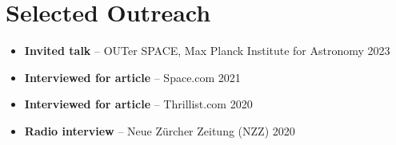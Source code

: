 \section*{Selected Outreach}

\begin{itemize}
    \item \textbf{Invited talk} -- OUTer SPACE, Max Planck Institute for Astronomy \hfill 2023
    \item \textbf{Interviewed for article} -- Space.com \hfill 2021
    \item \textbf{Interviewed for article} -- Thrillist.com \hfill 2020
    \item \textbf{Radio interview} -- Neue Zürcher Zeitung (NZZ) \hfill 2020
\end{itemize}